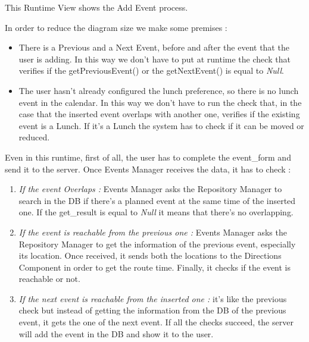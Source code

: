 This Runtime View shows the Add Event process.\par
In order to reduce the diagram size we make some premises :
\begin{itemize}
	\setlength{\leftskip}{1cm}
	\item There is a Previous and a Next Event, before and after the event that the user is adding. In this way we don’t have to put at runtime the check that verifies if the getPreviousEvent() or the getNextEvent() is equal to \emph{Null}.
	\item The user hasn’t already configured the lunch preference, so there is no lunch event in the calendar. In this way we don’t have to run the check that, in the case that the inserted event overlaps with another one, verifies if the existing event is a Lunch. If it’s a Lunch the system has to check if it can be moved or reduced.
\end{itemize}\par
Even in this runtime, first of all, the user has to complete the event\_form and send it to the server.
Once Events Manager receives the data, it has to check :
\begin{enumerate}
	\setlength{\leftskip}{1cm}
	\item \emph{If the event Overlaps :} Events Manager asks the Repository Manager to search in the DB if there’s a planned event at the same time of the inserted one. If the get\_result is equal to \emph{Null} it means that there’s no overlapping.
	\item \emph{If the event is reachable from the previous one :} Events Manager asks the Repository Manager to get the information of the previous event, especially its location. Once received, it sends both the locations to the Directions Component in order to get the route time. Finally, it checks if the event is reachable or not.
	\item \emph{If the next event is reachable from the inserted one :} it’s like the previous check but instead of getting the information from the DB of the previous event, it gets the one of the next event.
	If all the checks succeed, the server will add the event in the DB and show it to the user.
\end{enumerate}
